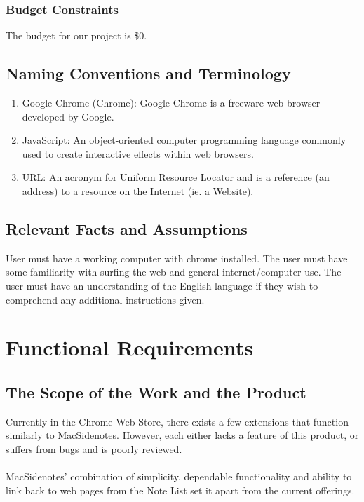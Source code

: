 \documentclass[12pt, titlepage]{article}
\begin{document}
\subsubsection{Budget Constraints}
The budget for our project is \$0.



\subsection{Naming Conventions and Terminology}

\begin{enumerate}
	\item Google Chrome (Chrome): Google Chrome is a freeware web browser developed 
	by Google.
	\item JavaScript: An object-oriented computer programming language commonly used 
	to create interactive effects within web browsers.
	\item URL: An acronym for Uniform Resource Locator and is a reference (an 
	address) to a resource on the Internet (ie. a Website). 
\end{enumerate}

\subsection{Relevant Facts and Assumptions}

User must have a working computer with chrome installed. The user must have some 
familiarity with surfing the web and general internet/computer use. The user must have an 
understanding of the English language if they wish to comprehend any additional 
instructions given. 

\section{Functional Requirements}

\subsection{The Scope of the Work and the Product}

Currently in the Chrome Web Store, there exists a few extensions that function 
similarly to MacSidenotes. However, each either lacks a feature of this 
product, or suffers from bugs and is poorly reviewed.\\
\\
MacSidenotes' combination of simplicity, dependable functionality and ability 
to link back to web pages from the Note List set it apart from the current 
offerings.
\end{document}
